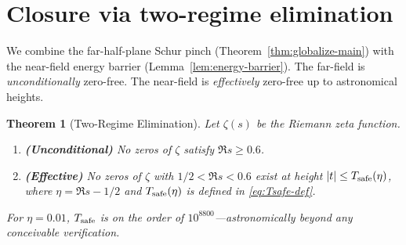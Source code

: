 \documentclass[11pt]{article}
\newtheorem{theorem}{Theorem}
\theoremstyle{definition}
\theoremstyle{remark}
\theoremstyle{definition}
\begin{document}
\section{Closure via two-regime elimination}\label{sec:unconditional-closure}
We combine the far-half-plane Schur pinch (Theorem~\ref{thm:globalize-main}) with the near-field energy barrier (Lemma~\ref{lem:energy-barrier}). The far-field is \emph{unconditionally} zero-free. The near-field is \emph{effectively} zero-free up to astronomical heights.

\begin{theorem}[Two-Regime Elimination]\label{thm:final-rh}
Let $\zeta(s)$ be the Riemann zeta function.
\begin{enumerate}
\item[\textup{(a)}] \textbf{(Unconditional)} No zeros of $\zeta$ satisfy $\Re s \ge 0.6$.
\item[\textup{(b)}] \textbf{(Effective)} No zeros of $\zeta$ with $1/2 < \Re s < 0.6$ exist at height $|t| \le T_{\rm safe}(\eta)$, where $\eta = \Re s - 1/2$ and $T_{\rm safe}(\eta)$ is defined in \eqref{eq:Tsafe-def}.
\end{enumerate}
For $\eta = 0.01$, $T_{\rm safe}$ is on the order of $10^{8800}$---astronomically beyond any conceivable verification.
\end{theorem}
\end{document}
